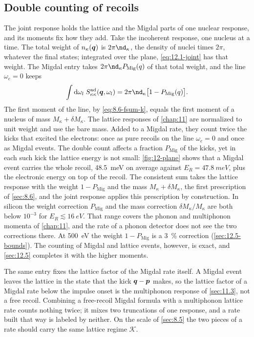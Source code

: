 \subsection{Double counting of recoils}\label{sec:12.1-counting}

The joint response holds the lattice and the Migdal parts of one nuclear response, and its moments fix how they add. Take the incoherent response, one nucleus at a time. The total weight of $n_\kappa(\bm{q})$ is $2\pi\nd_\kappa$, the density of nuclei times $2\pi$, whatever the final states; integrated over the plane, \cref{eq:12.1-joint} has that weight. The Migdal entry takes $2\pi\nd_\kappa P_{\mathrm{Mig}}(q)$ of that total weight, and the line $\omega_e = 0$ keeps
\begin{equation}
  \int\dd\omega_l\;S^{\mathrm{ad}}_{\kappa\kappa}(\vect{q},\omega_l) = 2\pi\nd_\kappa\bigl[1 - P_{\mathrm{Mig}}(q)\bigr] .
  \label{eq:12.1-zeroth}
\end{equation}
The first moment of the line, by \cref{eq:8.6-fsum-k}, equals the first moment of a nucleus of mass $M_\kappa + \delta M_\kappa$. The lattice responses of \cref{chap:11} are normalized to unit weight and use the bare mass. Added to a Migdal rate, they count twice the kicks that excited the electrons: once as pure recoils on the line $\omega_e = 0$ and once as Migdal events. The double count affects a fraction $P_{\mathrm{Mig}}$ of the kicks, yet in each such kick the lattice energy is not small: \cref{fig:12-plane} shows that a Migdal event carries the whole recoil, \SI{48.5}{meV} on average against $E_R = \SI{47.8}{meV}$, plus the electronic energy on top of the recoil. The consistent sum takes the lattice response with the weight $1 - P_{\mathrm{Mig}}$ and the mass $M_\kappa + \delta M_\kappa$, the first prescription of \cref{sec:8.6}, and the joint response applies this prescription by construction. In silicon the weight correction $P_{\mathrm{Mig}}$ and the mass correction $\delta M_\kappa/M_\kappa$ are both below $10^{-3}$ for $E_R \lesssim \SI{16}{eV}$. That range covers the phonon and multiphonon momenta of \cref{chap:11}, and the rate of a phonon detector does not see the two corrections there. At \SI{500}{eV} the weight $1 - P_{\mathrm{Mig}}$ is a \SI{3}{\percent} correction (\cref{sec:12.5-bounds}). The counting of Migdal and lattice events, however, is exact, and \cref{sec:12.5} completes it with the higher moments.

The same entry fixes the lattice factor of the Migdal rate itself. A Migdal event leaves the lattice in the state that the kick $\bm{q} - \bm{p}$ makes, so the lattice factor of a Migdal rate below the impulse onset is the multiphonon response of \cref{sec:11.3}, not a free recoil. Combining a free-recoil Migdal formula with a multiphonon lattice rate counts nothing twice; it mixes two truncations of one response, and a rate built that way is labeled by neither. On the scale of \cref{sec:8.5} the two pieces of a rate should carry the same lattice regime $\mathcal{K}$.

